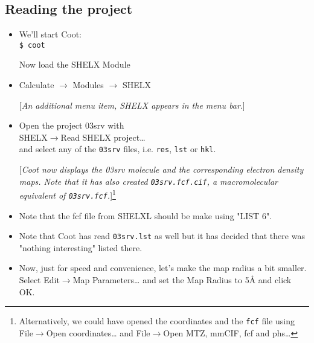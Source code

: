 \documentclass{article}
\begin{document}
\subsection{Reading the project}
\begin{itemize}
\item We'll start Coot: \\\texttt{\$ coot}

Now load the SHELX Module

\item \textsf{Calculate $\rightarrow$ Modules $\rightarrow$ SHELX}

  [\textsl{An additional menu item, SHELX appears in the menu bar}.]

\item Open the project 03srv with\\\textsf{SHELX$\to$Read SHELX
    project\ldots}\\and select any of the \texttt{03srv} files, i.e.
  \texttt{res}, \texttt{lst} or \texttt{hkl}.

  [\textsl{Coot now displays the 03srv molecule and the corresponding
    electron density maps. Note that it has also created
    \texttt{03srv.fcf.cif}, a macromolecular equivalent of
    \texttt{03srv.fcf}.}]\footnote{Alternatively, we could have opened
    the coordinates and the \texttt{fcf} file
    using\\\textsf{File$\to$Open coordinates\ldots} and
    \textsf{File$\to$Open MTZ, mmCIF, fcf and phs\ldots}}

\item Note that the fcf file from SHELXL should be make using "LIST
  6".

\item Note that Coot has read \texttt{03srv.lst} as well but it has
  decided that there was "nothing interesting" listed there.

\item Now, just for speed and convenience, let's make the map radius a
  bit smaller. Select \textsf{Edit$\to$Map Parameters\ldots} and set
  the Map Radius to 5{\AA} and click \textsf{OK}.
\end{itemize}
\end{document}
